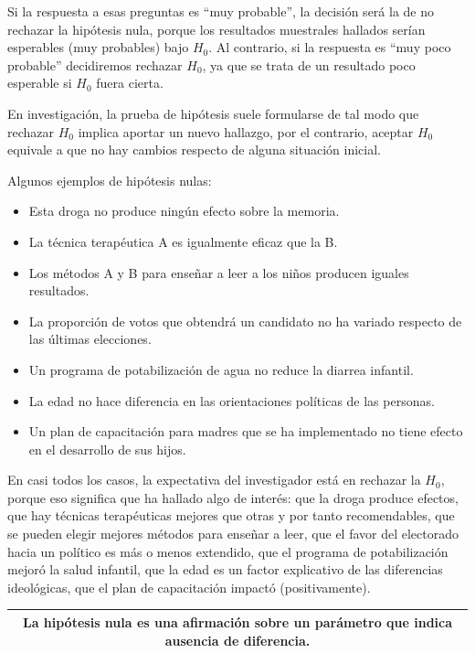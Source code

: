\documentclass[]{book}
\begin{document}
Si la respuesta a esas preguntas es ``muy probable'', la decisión será la
de no rechazar la hipótesis nula, porque los resultados muestrales
hallados serían esperables (muy probables) bajo \(H_{0}\). Al contrario, si la respuesta es ``muy poco probable'' decidiremos rechazar \(H_{0}\), ya que se trata de un resultado poco esperable si \(H_{0}\) fuera cierta.

En investigación, la prueba de hipótesis suele formularse de tal modo
que rechazar \(H_{0}\) implica aportar un nuevo hallazgo, por el contrario, aceptar \(H_{0}\) equivale a que no hay cambios respecto de alguna situación inicial.

Algunos ejemplos de hipótesis nulas:

\begin{itemize}
\item
  Esta droga no produce ningún efecto sobre la memoria.
\item
  La técnica terapéutica A es igualmente eficaz que la B.
\item
  Los métodos A y B para enseñar a leer a los niños producen iguales
  resultados.
\item
  La proporción de votos que obtendrá un candidato no ha variado respecto de las últimas elecciones.
\item
  Un programa de potabilización de agua no reduce la diarrea infantil.
\item
  La edad no hace diferencia en las orientaciones políticas de las personas.
\item
  Un plan de capacitación para madres que se ha implementado no tiene efecto en el desarrollo de sus hijos.
\end{itemize}

En casi todos los casos, la expectativa del investigador está en
rechazar la \(H_{0}\), porque eso significa que ha hallado algo de interés: que la droga produce efectos, que hay técnicas terapéuticas mejores que otras y por tanto recomendables, que se pueden elegir mejores métodos para enseñar a leer, que el favor del electorado hacia un político es más o menos extendido, que el programa de potabilización mejoró la salud infantil, que la edad es un factor explicativo de las diferencias ideológicas, que el plan de capacitación impactó (positivamente).

\begin{longtable}[]{@{}c@{}}
\toprule
\endhead
\begin{minipage}[t]{0.97\columnwidth}\centering
\textbf{La hipótesis nula es una afirmación sobre un parámetro que indica ausencia de diferencia.}\strut
\end{minipage}\tabularnewline
\bottomrule
\end{longtable}
\end{document}
